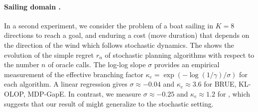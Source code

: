 \documentclass[runningheads]{llncs}
\begin{document}
\paragraph{Sailing domain \citep{Vanderbei1996}.}
In a second experiment, we consider the problem of a boat sailing in $K=8$ directions to reach a goal, and enduring a cost (move duration) that depends on the direction of the wind which follows stochastic dynamics. The  shows the evolution of the simple regret $r_n$ of stochastic planning algorithms with respect to the number $n$ of oracle calls. The log-log slope $\sigma$ provides an empirical measurement of the effective branching factor $\kappa_e = \exp(-\log(1/\gamma)/\sigma)$ for each algorithm. A linear regression gives $\sigma \approx-0.04$ and $\kappa_e \approx 3.6$ for BRUE, KL-OLOP, MDP-GapE. In contrast, we measure $\sigma \approx-0.25$ and $\kappa_e \approx 1.2$ for \GBOP, which suggests that our result of  might generalize to the stochastic setting.
\end{document}

